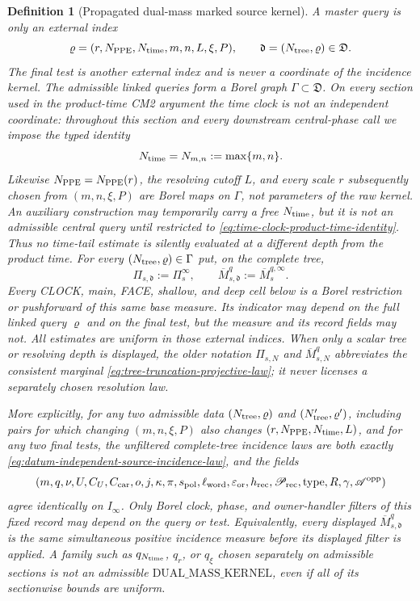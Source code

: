\documentclass[11pt]{article}
\newtheorem{definition}[theorem]{Definition}
\begin{document}
\begin{definition}[Propagated dual-mass marked source kernel]
A master query is only an external index
\[
 \varrho=(r,N_{\rm PPE},N_{\rm time},m,n,L,\xi,P),
 \qquad \mathfrak d=(N_{\rm tree},\varrho)\in\mathfrak D.
\]
The final test is another external index and is never a coordinate of the
incidence kernel.  The admissible linked queries form a Borel graph
$\Gamma\subset\mathfrak D$.  On every section used in the product-time CM2
argument the time clock is not an independent coordinate: throughout this
section and every downstream central-phase call we impose the typed identity
\begin{equation}
\label{eq:time-clock-product-time-identity}
 N_{\rm time}=N_{m,n}:=\max\{m,n\}.
\end{equation}
Likewise $N_{\rm PPE}=N_{\rm PPE}(r)$, the resolving cutoff $L$, and every
scale $r$ subsequently chosen from $(m,n,\xi,P)$ are Borel maps on
$\Gamma$, not parameters of the raw kernel.  An auxiliary construction may
temporarily carry a free $N_{\rm time}$, but it is not an admissible central
query until restricted to
\eqref{eq:time-clock-product-time-identity}.  Thus no time-tail estimate is
silently evaluated at a different depth from the product time.
For every $(N_{\rm tree},\varrho)\in\Gamma$ put, on the complete tree,
\[
 \Pi_{s,\mathfrak d}:=\Pi_s^\infty,\qquad
 \overline M_{s,\mathfrak d}^{q}:=\overline M_s^{q,\infty}.
\]
Every CLOCK, main, FACE, shallow, and deep cell below is a Borel restriction
or pushforward of this same base measure.  Its indicator may depend on the
full linked query $\varrho$ and on the final test, but the measure and its
record fields may not.  All estimates are uniform in those external
indices.  When only a scalar tree or resolving depth is displayed, the
older notation $\Pi_{s,N}$ and $\overline M_{s,N}^{q}$ abbreviates the
consistent marginal \eqref{eq:tree-truncation-projective-law}; it never
licenses a separately chosen resolution law.

More explicitly, for any two admissible data
$(N_{\rm tree},\varrho)$ and $(N'_{\rm tree},\varrho')$,
including pairs for which changing $(m,n,\xi,P)$ also changes
$(r,N_{\rm PPE},N_{\rm time},L)$, and for any two final tests, the
unfiltered complete-tree incidence laws are both exactly
\eqref{eq:datum-independent-source-incidence-law}, and the fields
\begin{equation}
\label{eq:source-kernel-projective-consistency}
 (m,q,\nu,U,C_U,C_{\rm car},o,j,\kappa,\pi,s_{\rm pol},
   \ell_{\rm word},\varepsilon_{\rm or},h_{\rm rec},
   \mathscr P_{\rm rec},\operatorname{type},R,\gamma,
   \mathscr A^{\rm opp})
\end{equation}
agree identically on $I_\infty$.  Only Borel clock, phase, and owner-handler
\emph{filters of this fixed record} may depend on the query or test.
Equivalently, every displayed $\overline M_{s,\mathfrak d}^{q}$ is the same
simultaneous positive incidence measure before its displayed filter is
applied.  A family such as $q_{N_{\rm time}}$, $q_r$, or $q_\xi$ chosen
separately on admissible sections is not an admissible
$\mathrm{DUAL\_MASS\_KERNEL}$, even if all of its sectionwise bounds are
uniform.


\end{definition}
\end{document}
